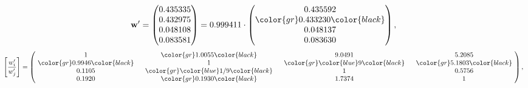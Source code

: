 \begin{example}
\begin{equation*}
\mathbf{w}^{\prime} =
\begin{pmatrix}
0.435335\\
0.432975\\
0.048108\\
0.083581
\end{pmatrix} =
0.999411\cdot
\begin{pmatrix}
0.435592\\
\color{gr} 0.433230\color{black} \\
0.048137\\
0.083630
\end{pmatrix},
\end{equation*}
\begin{equation*}
\left[ \frac{{w}^{\prime}_i}{{w}^{\prime}_j} \right] =
\begin{pmatrix}
$\,\,$ 1 $\,\,$ & $\,\,$\color{gr} 1.0055\color{black} $\,\,$ & $\,\,$9.0491$\,\,$ & $\,\,$5.2085$\,\,$ \\
$\,\,$\color{gr} 0.9946\color{black} $\,\,$ & $\,\,$ 1 $\,\,$ & $\,\,$\color{gr} \color{blue} 9\color{black} $\,\,$ & $\,\,$\color{gr} 5.1803\color{black}   $\,\,$ \\
$\,\,$0.1105$\,\,$ & $\,\,$\color{gr} \color{blue}  1/9\color{black} $\,\,$ & $\,\,$ 1 $\,\,$ & $\,\,$0.5756 $\,\,$ \\
$\,\,$0.1920$\,\,$ & $\,\,$\color{gr} 0.1930\color{black} $\,\,$ & $\,\,$1.7374$\,\,$ & $\,\,$ 1  $\,\,$ \\
\end{pmatrix},
\end{equation*}
\end{example}
\newpage
